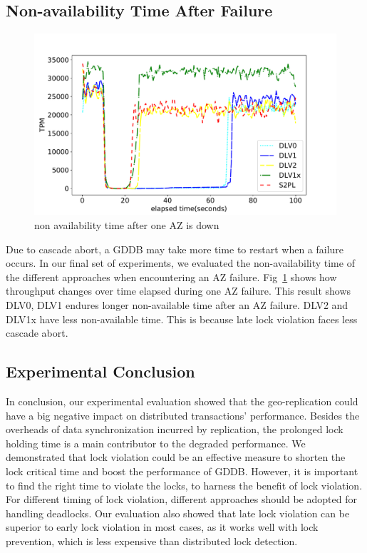 \documentclass[conference]{IEEEtran}
\begin{document}
\subsection{Non-availability Time After Failure}

\begin{figure}[tbp]
  \centering
  { \includegraphics[scale=0.36] {figure/plot_availability}
  \caption{non availability time after one AZ is down}
  \label{fig:plot_availability:tpm}}
\end{figure}


Due to cascade abort, a GDDB may take more time to restart when a failure occurs.
In our final set of experiments, we evaluated the non-availability time of the different approaches when encountering an AZ failure.
Fig~\ref{fig:plot_availability:tpm} shows how throughput changes over time elapsed during one AZ failure.
This result shows DLV0, DLV1 endures longer non-available time after an AZ failure.
DLV2 and DLV1x have less non-available time. This is because late lock violation faces less cascade abort.


\subsection{Experimental Conclusion}

In conclusion, our experimental evaluation showed that the geo-replication could have a big negative impact on distributed transactions' performance.
Besides the overheads of data synchronization incurred by replication, the prolonged lock holding time is a main contributor to the degraded performance.
We demonstrated that lock violation could be an effective measure to shorten the lock critical time and boost the performance of GDDB.
However, it is important to find the right time to violate the locks, to harness the benefit of lock violation.
For different timing of lock violation, different approaches should be adopted for handling deadlocks.
Our evaluation also showed that late lock violation can be superior to early lock violation in most cases, as it works well with lock prevention, which is less expensive than distributed lock detection.
\end{document}

